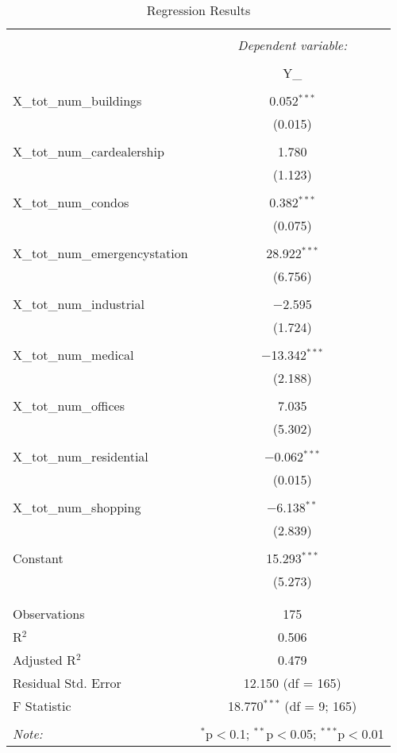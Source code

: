 \documentclass{article}
\begin{document}
\begin{table}[!htbp] \centering 
  \caption{Regression Results} 
  \label{} 
\begin{tabular}{@{\extracolsep{5pt}}lc} 
\\[-1.8ex]\hline 
\hline \\[-1.8ex] 
 & \multicolumn{1}{c}{\textit{Dependent variable:}} \\ 
\cline{2-2} 
\\[-1.8ex] & Y\_ \\ 
\hline \\[-1.8ex] 
 X\_tot\_num\_buildings & 0.052$^{***}$ \\ 
  & (0.015) \\ 
  & \\ 
 X\_tot\_num\_cardealership & 1.780 \\ 
  & (1.123) \\ 
  & \\ 
 X\_tot\_num\_condos & 0.382$^{***}$ \\ 
  & (0.075) \\ 
  & \\ 
 X\_tot\_num\_emergencystation & 28.922$^{***}$ \\ 
  & (6.756) \\ 
  & \\ 
 X\_tot\_num\_industrial & $-$2.595 \\ 
  & (1.724) \\ 
  & \\ 
 X\_tot\_num\_medical & $-$13.342$^{***}$ \\ 
  & (2.188) \\ 
  & \\ 
 X\_tot\_num\_offices & 7.035 \\ 
  & (5.302) \\ 
  & \\ 
 X\_tot\_num\_residential & $-$0.062$^{***}$ \\ 
  & (0.015) \\ 
  & \\ 
 X\_tot\_num\_shopping & $-$6.138$^{**}$ \\ 
  & (2.839) \\ 
  & \\ 
 Constant & 15.293$^{***}$ \\ 
  & (5.273) \\ 
  & \\ 
\hline \\[-1.8ex] 
Observations & 175 \\ 
R$^{2}$ & 0.506 \\ 
Adjusted R$^{2}$ & 0.479 \\ 
Residual Std. Error & 12.150 (df = 165) \\ 
F Statistic & 18.770$^{***}$ (df = 9; 165) \\ 
\hline 
\hline \\[-1.8ex] 
\textit{Note:}  & \multicolumn{1}{r}{$^{*}$p$<$0.1; $^{**}$p$<$0.05; $^{***}$p$<$0.01} \\ 
\end{tabular} 
\end{table} 
\end{document}
